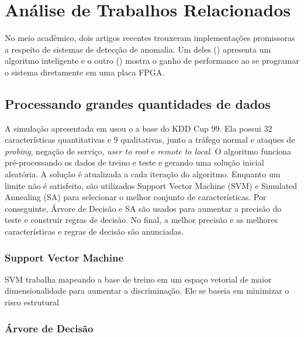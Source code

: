 \chapter{Análise de Trabalhos Relacionados}
\label{analise}

No meio acadêmico, dois artigos recentes trouxeram implementações promissoras a respeito de sistemas de detecção de
anomalia. Um deles (\cite{lin12}) apresenta um algoritmo inteligente e o outro (\cite{papadonikolakis12}) mostra o
ganho de performance ao se programar o sistema diretamente em uma placa FPGA.

\section{Processando grandes quantidades de dados}
A simulação apresentada em \cite{lin12} usou o a base do KDD Cup 99. Ela possui 32 características quantitativas e
9 qualitativas, junto a tráfego normal e ataques de \textit{probing}, negação de serviço, \textit{user to root} e
\textit{remote to local}. O algoritmo funciona pré-processando os dados de treino e teste e gerando uma solução
inicial aleatória. A solução é atualizada a cada iteração do algoritmo. Enquanto um limite não é satisfeito,
são utilizados Support Vector Machine (SVM) e Simulated Annealing (SA) para selecionar o melhor conjunto de
características. Por conseguinte, Árvore de Decisão e SA são usados para aumentar a precisão do teste e construir
regras de decisão. No final, a melhor precisão e as melhores características e regras de decisão são anunciadas.

\subsection{Support Vector Machine}
SVM trabalha mapeando a base de treino em um espaço vetorial de maior dimensionalidade para aumentar a discriminação.
Ele se baseia em minimizar o risco estrutural

\subsection{Árvore de Decisão}